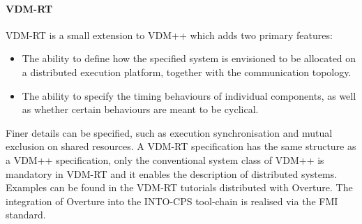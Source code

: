 \paragraph{VDM-RT}
VDM-RT is a small extension to VDM++ which adds two primary features:
%
%
%
\begin{itemize}
%
\item  The ability to define how the specified system is envisioned to be allocated on a distributed execution platform, together with the communication topology.
%
\item  The ability to specify the timing behaviours of individual components, as well as whether certain behaviours are meant to be cyclical.
%
\end{itemize}
%
Finer details can be specified, such as execution synchronisation and mutual exclusion on shared resources.
%
A VDM-RT specification has the same structure as a VDM++ specification, only the conventional system class of VDM++ is mandatory in VDM-RT and it enables the description of distributed systems.
%
Examples can be found in the VDM-RT tutorials distributed with Overture. The integration of Overture into the INTO-CPS tool-chain is realised via the FMI standard.

%
%
%
